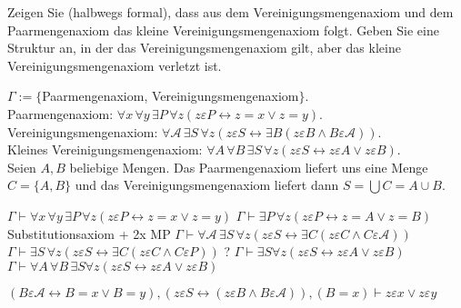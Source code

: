 
\begin{exercise}[258]

Zeigen Sie (halbwegs formal), dass aus dem Vereinigungsmengenaxiom und dem
Paarmengenaxiom das kleine Vereinigungsmengenaxiom folgt. Geben Sie eine Struktur
an, in der das Vereinigungsmengenaxiom gilt, aber das kleine Vereinigungsmengenaxiom
verletzt ist.

\end{exercise}


\begin{solution}
$\Gamma := \{$Paarmengenaxiom, Vereinigungsmengenaxiom$\}$. \\
Paarmengenaxiom: $\forall x\, \forall y\, \exists P \, \forall z
(z \varepsilon P \leftrightarrow z = x \lor z = y)$. \\
Vereinigungsmengenaxiom:
$\forall \mathcal{A}\, \exists S\, \forall z (z \varepsilon S \leftrightarrow
\exists B (z \varepsilon B \land B \varepsilon \mathcal{A}))$. \\
Kleines Vereinigungsmengenaxiom:
$\forall A\, \forall B\, \exists S\, \forall z (z \varepsilon S \leftrightarrow
z \varepsilon A \lor z \varepsilon B)$. \\

Seien $A, B$ beliebige Mengen.
Das Paarmengenaxiom liefert uns eine Menge $C = \{A, B\}$ und das
Vereinigungsmengenaxiom liefert dann $S = \bigcup C = A \cup B$.

\begin{algorithmic}[1]
\State $\Gamma \vdash \forall x\, \forall y\, \exists P \, \forall z
(z \varepsilon P \leftrightarrow z = x \lor z = y)$
\State $\Gamma \vdash \exists P \, \forall z
(z \varepsilon P \leftrightarrow z = A \lor z = B)$
\Comment Substitutionsaxiom + 2x MP
\State $\Gamma \vdash \forall \mathcal{A}\, \exists S\, \forall z (z \varepsilon S \leftrightarrow
\exists C (z \varepsilon C \land C \varepsilon \mathcal{A}))$
\State $\Gamma \vdash \exists S\, \forall z (z \varepsilon S \leftrightarrow
\exists C (z \varepsilon C \land C \varepsilon P))$
\State ?
\State $\Gamma \vdash \exists S \forall z (z \varepsilon S \leftrightarrow z \varepsilon A \lor z \varepsilon B)$
\State $\Gamma \vdash \forall A\, \forall B\, \exists S \forall z (z \varepsilon S \leftrightarrow z \varepsilon A \lor z \varepsilon B)$

\end{algorithmic}

\begin{algorithmic}[1]
  \State $(B \varepsilon \mathcal{A} \leftrightarrow B = x \lor B = y),
  (z \varepsilon S \leftrightarrow (z \varepsilon B \land B \varepsilon \mathcal{A})),
  (B = x)
  \vdash z \varepsilon x \lor z \varepsilon y$
\end{algorithmic}

\end{solution}
